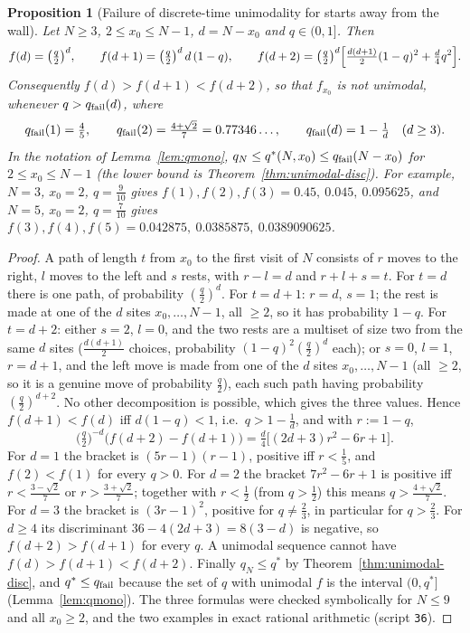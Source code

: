 \documentclass[11pt,a4paper]{article}
\newtheorem{proposition}[theorem]{Proposition}
\theoremstyle{definition}
\theoremstyle{remark}
\begin{document}
\begin{proposition}[Failure of discrete-time unimodality for starts away from the wall]\label{prop:startfail}
Let $N\ge3$, $2\le x_0\le N-1$, $d=N-x_0$ and $q\in(0,1]$. Then
\[
  f(d)=\bigl(\tfrac q2\bigr)^d,\qquad f(d+1)=\bigl(\tfrac q2\bigr)^d\,d\,(1-q),\qquad
  f(d+2)=\bigl(\tfrac q2\bigr)^d\Bigl[\tfrac{d(d+1)}2(1-q)^2+\tfrac d4q^2\Bigr].
\]
Consequently $f(d)>f(d+1)<f(d+2)$, so that $f_{x_0}$ is \emph{not} unimodal, whenever $q>q_{\rm fail}(d)$, where
\[
  q_{\rm fail}(1)=\tfrac45,\qquad q_{\rm fail}(2)=\tfrac{4+\sqrt2}7=0.77346\ldots,\qquad q_{\rm fail}(d)=1-\tfrac1d\quad(d\ge3).
\]
In the notation of Lemma~\ref{lem:qmono}, $q_N\le q^*(N,x_0)\le q_{\rm fail}(N-x_0)$ for $2\le x_0\le N-1$ (the lower bound is
Theorem~\ref{thm:unimodal-disc}). For example, $N=3$, $x_0=2$, $q=\frac9{10}$ gives $f(1),f(2),f(3)=0.45,\ 0.045,\ 0.095625$,
and $N=5$, $x_0=2$, $q=\frac7{10}$ gives $f(3),f(4),f(5)=0.042875,\ 0.0385875,\ 0.0389090625$.
\end{proposition}
\begin{proof}
A path of length $t$ from $x_0$ to the first visit of $N$ consists of $r$ moves to the right, $l$ moves to the left and $s$
rests, with $r-l=d$ and $r+l+s=t$. For $t=d$ there is one path, of probability $(\frac q2)^d$. For $t=d+1$: $r=d$, $s=1$;
the rest is made at one of the $d$ sites $x_0,\dots,N-1$, all $\ge2$, so it has probability $1-q$. For $t=d+2$: either
$s=2$, $l=0$, and the two rests are a multiset of size two from the same $d$ sites ($\frac{d(d+1)}2$ choices, probability
$(1-q)^2(\frac q2)^d$ each); or $s=0$, $l=1$, $r=d+1$, and the left move is made from one of the $d$ sites
$x_0,\dots,N-1$ (all $\ge2$, so it is a genuine move of probability $\frac q2$), each such path having probability
$(\frac q2)^{d+2}$. No other decomposition is possible, which gives the three values. Hence $f(d+1)<f(d)$ iff $d(1-q)<1$,
i.e.\ $q>1-\frac1d$, and with $r:=1-q$,
\[
  \bigl(\tfrac q2\bigr)^{-d}\bigl(f(d+2)-f(d+1)\bigr)=\tfrac d4\bigl[(2d+3)r^2-6r+1\bigr].
\]
For $d=1$ the bracket is $(5r-1)(r-1)$, positive iff $r<\frac15$, and $f(2)<f(1)$ for every $q>0$. For $d=2$ the bracket
$7r^2-6r+1$ is positive iff $r<\frac{3-\sqrt2}7$ or $r>\frac{3+\sqrt2}7$; together with $r<\frac12$ (from $q>\frac12$) this
means $q>\frac{4+\sqrt2}7$. For $d=3$ the bracket is $(3r-1)^2$, positive for $q\ne\frac23$, in particular for $q>\frac23$. For
$d\ge4$ its discriminant $36-4(2d+3)=8(3-d)$ is negative, so $f(d+2)>f(d+1)$ for every $q$. A unimodal sequence cannot have
$f(d)>f(d+1)<f(d+2)$. Finally $q_N\le q^*$ by Theorem~\ref{thm:unimodal-disc}, and $q^*\le q_{\rm fail}$ because the set of
$q$ with unimodal $f$ is the interval $(0,q^*]$ (Lemma~\ref{lem:qmono}). The three formulas were checked symbolically for
$N\le9$ and all $x_0\ge2$, and the two examples in exact rational arithmetic (script \texttt{36}).
\end{proof}
\end{document}
